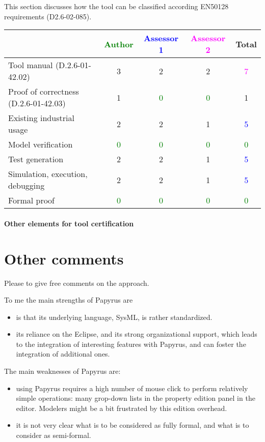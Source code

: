 This section discusses how the tool can be classified according EN50128 requirements (D2.6-02-085).


\begin{tabular}{|l | c | c | c | c|}
\hline
& \textcolor{green}{Author} & \textcolor{blue}{Assessor 1} & \textcolor{magenta}{Assessor 2} & Total \\
\hline
Tool manual (D.2.6-01-42.02) & 3    & 2    & 2    & \textcolor{magenta}{7} \\
\hline
Proof of correctness (D.2.6-01-42.03) & 1    & \textcolor{green}{0} & \textcolor{green}{0}  & 1    \\
\hline
Existing industrial usage & 2    & 2    & 1    & \textcolor{blue}{5} \\
\hline
Model verification & \textcolor{green}{0} & \textcolor{green}{0} & \textcolor{green}{0} & \textcolor{green}{0} \\
\hline
Test generation & 2    & 2    & 1    & \textcolor{blue}{5} \\
\hline
Simulation, execution, debugging & 2    & 2    & 1    & \textcolor{blue}{5} \\
\hline
Formal proof & \textcolor{green}{0} & \textcolor{green}{0} & \textcolor{green}{0} & \textcolor{green}{0} \\
\hline
\end{tabular}

\paragraph{Other elements for tool certification}

\section{Other comments}
Please to give free comments on the approach.

\begin{assessor1}
To me the main strengths of Papyrus are
\begin{itemize}
\item is that its underlying language, SysML, is rather standardized. 
\item its reliance on the Eclipse, and its strong organizational support, which leads to the integration of interesting features with Papyrus, and can foster the integration of additional ones. 
\end{itemize}

The main weaknesses of Papyrus are: 
\begin{itemize}
\item using Papyrus requires a high number of mouse click to perform relatively simple operations: many grop-down lists in the property edition panel in the editor. Modelers might be a bit frustrated by this edition overhead. 
\item it is not very clear what is to be considered as fully formal, and what is to consider as semi-formal.  
\end{itemize}
\end{assessor1}

